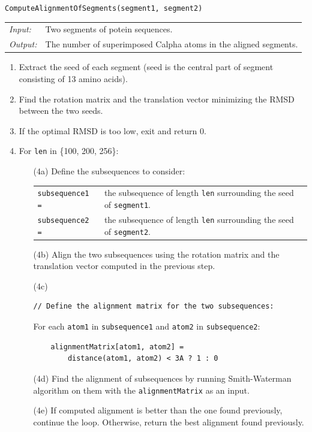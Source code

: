 \begin{algorithm}
\caption{\texttt{ComputeAlignmentOfSegments(segment1, segment2)}}

\begin{tabular}{lp{13.39cm}}
{\em Input:} &
Two segments of potein sequences.\\
{\em Output:} &
The number of superimposed Calpha atoms in the aligned segments.\\
\end{tabular}

\begin{enumerate}
\item
Extract the seed of each segment (seed is the central part of segment consisting of 13 amino acids).

\item
Find the rotation matrix and the translation vector minimizing the RMSD between the two seeds.

\item
If the optimal RMSD is too low, exit and return 0.

\item
For \texttt{len} in \{100, 200, 256\}:
\begin{itemize}
\item[(4a)]
Define the subsequences to consider:\\
\begin{tabular}{lp{8cm}}
\texttt{subsequence1 =} &
the subsequence of length \texttt{len} surrounding the seed of \texttt{segment1}. \\
\texttt{subsequence2 =} &
the subsequence of length \texttt{len} surrounding the seed of \texttt{segment2}. \\
\end{tabular}

\item[(4b)]
Align the two subsequences using the rotation matrix and the translation vector computed in the previous step.

\item[(4c)]
\begin{verbatim}
// Define the alignment matrix for the two subsequences:
\end{verbatim}
For each \texttt{atom1} in \texttt{subsequence1} and \texttt{atom2} in \texttt{subsequence2}:
\begin{verbatim}
    alignmentMatrix[atom1, atom2] = 
        distance(atom1, atom2) < 3A ? 1 : 0
\end{verbatim}

\item[(4d)]
Find the alignment of subsequences by running Smith-Waterman algorithm on them with the \texttt{alignmentMatrix} as an input.

\item[(4e)]
If computed alignment is better than the one found previously, continue the loop. Otherwise, return the best alignment found previously.

\end{itemize} 

\end{enumerate}
\end{algorithm}



